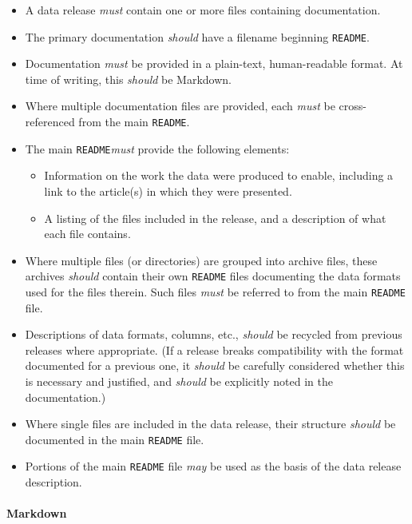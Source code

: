 \documentclass{article}
\newcommand\rfcword[1]{\emph{#1}\xspace}
\newcommand\must{\rfcword{must}}
\newcommand\should{\rfcword{should}}
\newcommand\may{\rfcword{may}}
\newcommand\filename[1]{\texttt{#1}\xspace}
\newcommand\readme{\filename{README}\xspace}
\begin{document}
\begin{itemize}
  \item
        A data release \must contain one or more files containing documentation.
  \item
        The primary documentation \should have a filename beginning \readme.
  \item
        Documentation \must be provided in a plain-text, human-readable format.
        At time of writing,
        this \should be Markdown.
  \item
        Where multiple documentation files are provided,
        each \must be cross-referenced from the main \readme.
  \item
        The main \readme \must provide the following elements:
        \begin{itemize}
          \item
                Information on the work the data were produced to enable,
                including a link to the article(s) in which they were presented.
          \item
                A listing of the files included in the release,
                and a description of what each file contains.
        \end{itemize}
  \item
        Where multiple files (or directories) are grouped into archive files,
        these archives \should contain their own \readme files
        documenting the data formats used for the files therein.
        Such files \must be referred to from the main \readme file.
  \item
        Descriptions of data formats, columns, etc.,
        \should be recycled from previous releases where appropriate.
        (If a release breaks compatibility with the format documented for a previous one,
        it \should be carefully considered whether this is necessary and justified,
        and \should be explicitly noted in the documentation.)
  \item
        Where single files are included in the data release,
        their structure \should be documented in the main \readme file.
  \item
        Portions of the main \readme file \may be used as
        the basis of the data release description.
\end{itemize}

\paragraph{Markdown}
\end{document}
